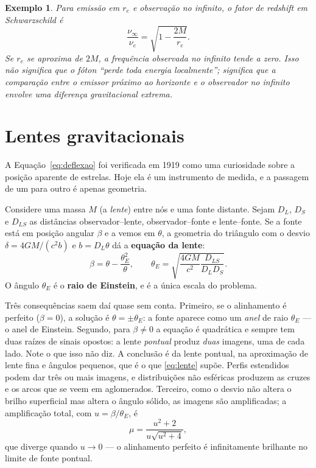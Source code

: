 \documentclass[12pt,a4paper,oneside]{book}
\theoremstyle{rgplain}
\newtheorem{example}{Exemplo}[chapter]
\theoremstyle{rgremark}
\begin{document}
\begin{example}
Para emissão em $r_e$ e observação no infinito, o fator de redshift em
Schwarzschild é
\[
  \frac{\nu_\infty}{\nu_e}=\sqrt{1-\frac{2M}{r_e}}.
\]
Se $r_e$ se aproxima de $2M$, a frequência observada no infinito tende a zero.
Isso não significa que o fóton ``perde toda energia localmente''; significa
que a comparação entre o emissor próximo ao horizonte e o observador no
infinito envolve uma diferença gravitacional extrema.
\end{example}

\section{Lentes gravitacionais}
\label{sec:lentes}

A Equação~\eqref{eq:deflexao} foi verificada em 1919 como uma curiosidade
sobre a posição aparente de estrelas. Hoje ela é um instrumento de medida, e
a passagem de um para outro é apenas geometria.

Considere uma massa $M$ (a \emph{lente}) entre nós e uma fonte distante.
Sejam $D_L$, $D_S$ e $D_{LS}$ as distâncias observador--lente,
observador--fonte e lente--fonte. Se a fonte está em posição angular $\beta$
e a vemos em $\theta$, a geometria do triângulo com o desvio
$\delta=4GM/(c^2b)$ e $b=D_L\theta$ dá a \textbf{equação da lente}:
\begin{equation}
  \beta=\theta-\frac{\theta_E^2}{\theta},
  \qquad
  \theta_E=\sqrt{\frac{4GM}{c^2}\frac{D_{LS}}{D_LD_S}} .
  \label{eq:lente}
\end{equation}
O ângulo $\theta_E$ é o \textbf{raio de Einstein}, e é a única escala do
problema.

Três consequências saem daí quase sem conta. Primeiro, se o alinhamento é
perfeito ($\beta=0$), a solução é $\theta=\pm\theta_E$: a fonte aparece como
um \emph{anel} de raio $\theta_E$ --- o anel de Einstein. Segundo, para
$\beta\ne0$ a equação é quadrática e sempre tem duas raízes de sinais
opostos: a lente \emph{pontual} produz \emph{duas} imagens, uma de cada lado.
Note o que isso não diz. A conclusão é da lente pontual, na aproximação de
lente fina e ângulos pequenos, que é o que \eqref{eq:lente} supõe. Perfis
estendidos podem dar três ou mais imagens, e distribuições não esféricas
produzem as cruzes e os arcos que se veem em aglomerados. Terceiro, como o desvio não altera o brilho superficial mas altera o
ângulo sólido, as imagens são amplificadas; a amplificação total, com
$u=\beta/\theta_E$, é
\begin{equation}
  \mu=\frac{u^2+2}{u\sqrt{u^2+4}} ,
  \label{eq:amplificacao}
\end{equation}
que diverge quando $u\to0$ --- o alinhamento perfeito é infinitamente
brilhante no limite de fonte pontual.
\end{document}
